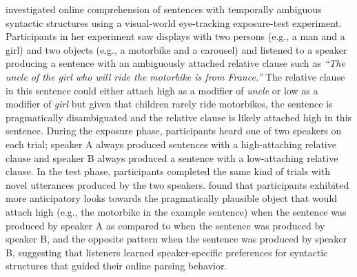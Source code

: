 \cite{Kamide2012} investigated online comprehension of sentences with temporally ambiguous syntactic structures using a visual-world eye-tracking exposure-test experiment. 
Participants in her experiment saw displays with two persons (e.g., a man and a girl) and two objects (e.g., a motorbike and a carousel) and listened to a speaker producing
a sentence with an ambiguously attached relative clause such as \textit{``The uncle of the girl who will ride the motorbike is from France.''} The relative clause in this sentence could
either attach high as a modifier of \textit{uncle} or low as a modifier of \textit{girl} but given that children rarely ride motorbikes, the sentence is pragmatically disambiguated and the
relative clause is likely attached high in this sentence. During the exposure phase, participants heard one of two speakers on each trial; speaker A always produced sentences with 
a high-attaching relative clause and speaker B always produced a sentence with a low-attaching relative clause. In the test phase, participants completed the same kind of trials with 
novel utterances produced by the two speakers. \cite{Kamide2012} found that participants exhibited more anticipatory looks towards the pragmatically plausible object that would attach
high (e.g., the motorbike in the example sentence) when the sentence was produced by speaker A as compared to when the sentence was produced by speaker B, and the opposite pattern when
the sentence was produced by speaker B, suggesting that listeners learned speaker-specific preferences for syntactic structures that guided their online parsing behavior. 

